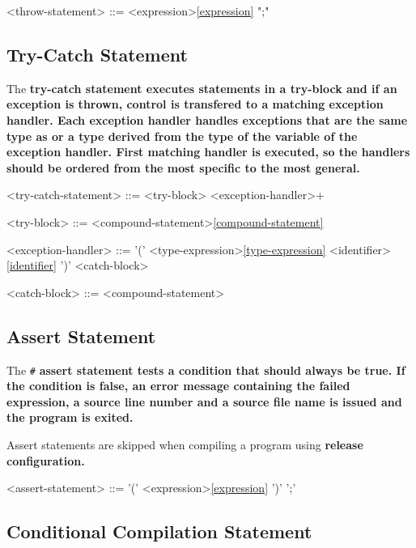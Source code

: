\documentclass[a4paper,oneside,11pt]{article}
\begin{document}
\begin{grammar}
\label{throw-statement}<throw-statement> ::=  <expression>\ref{expression} ";"
\end{grammar}

\subsection{Try-Catch Statement}

The \bf{try-catch} statement executes statements in a try-block and if an exception is thrown, control is transfered
to a matching exception handler. Each exception handler handles exceptions that are the same type as or a type derived from
the type of the variable of the exception handler. First matching handler is executed, so the handlers should be
ordered from the most specific to the most general.

\begin{grammar}
\label{try-catch-statement}<try-catch-statement> ::=  <try-block> <exception-handler>+

<try-block> ::= <compound-statement>\ref{compound-statement}

<exception-handler> ::=  '(' <type-expression>\ref{type-expression} <identifier>\ref{identifier} ')' <catch-block>

<catch-block> ::= <compound-statement>
\end{grammar}

\subsection{Assert Statement}

The \verb|#| \bf{assert} statement tests a condition that should always be true.
If the condition is false, an error message containing the failed expression, a source line number and a source file name is issued and the program is exited.

Assert statements are skipped when compiling a program using \bf{release} configuration.

\begin{grammar}
\label{assert-statement}<assert-statement> ::=  '(' <expression>\ref{expression} ')' ';'
\end{grammar}

\subsection{Conditional Compilation Statement}
\end{document}
